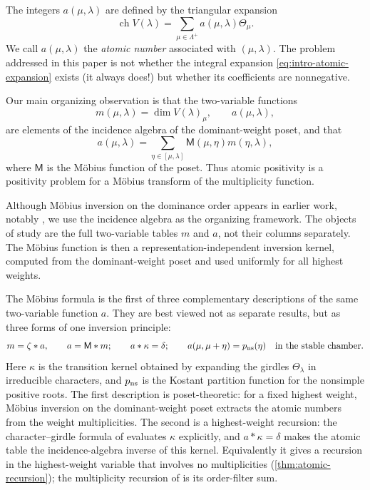 \documentclass[11pt]{article}
\theoremstyle{definition}
\theoremstyle{remark}
\newcommand{\Pesos}{\Lambda}
\newcommand{\chr}{\operatorname{ch}}
\newcommand{\Mu}{\mathsf{M}}
\begin{document}
The integers $a(\mu,\lambda)$ are defined by the triangular expansion
\begin{equation}\label{eq:intro-atomic-expansion}
    \chr V(\lambda)
      =\sum_{\mu\in\Pesos^+} a(\mu,\lambda)\Theta_\mu.
\end{equation}
We call $a(\mu,\lambda)$ the \emph{atomic number} associated with
$(\mu,\lambda)$.  The problem addressed in this paper is not whether the
integral expansion \eqref{eq:intro-atomic-expansion} exists (it always does!)
but whether its coefficients are nonnegative.

Our main organizing observation is that the two-variable functions
\[
   m(\mu,\lambda)=\dim V(\lambda)_\mu,
   \qquad a(\mu,\lambda),
\]
are elements of the incidence algebra of the dominant-weight poset, and that
\begin{equation}\label{eq:intro-mobius}
    a(\mu,\lambda)
      =\sum_{\eta\in[\mu,\lambda]}
        \Mu(\mu,\eta)m(\eta,\lambda),
\end{equation}
where $\Mu$ is the M\"obius function of the poset.  Thus atomic positivity is a
positivity problem for a M\"obius transform of the multiplicity function.

Although M\"obius inversion on the dominance order appears in earlier work,
notably \cite{MR4178925}, we use the incidence algebra as the organizing
framework.  The objects of study are the full two-variable tables $m$ and $a$,
not their columns separately.  The M\"obius function is then a
representation-independent inversion kernel, computed from the dominant-weight
poset and used uniformly for all highest weights.

The M\"obius formula is the first of three complementary descriptions of the
same two-variable function $a$.  They are best viewed not as separate results,
but as three forms of one inversion principle:
\begin{equation}\label{eq:intro-three-descriptions}
   m=\zeta*a,
   \qquad a=\Mu*m;
   \qquad
   a*\kappa=\delta;
   \qquad
   a(\mu,\mu+\eta)=p_{\rm ns}(\eta)
   \quad\text{in the stable chamber}.
\end{equation}
Here $\kappa$ is the transition kernel obtained by expanding the girdles
$\Theta_\lambda$ in irreducible characters, and $p_{\rm ns}$ is the Kostant
partition function for the nonsimple positive roots.  The first description is
poset-theoretic: for a fixed highest weight, M\"obius inversion on the
dominant-weight poset extracts the atomic numbers from the weight
multiplicities.  The second is a highest-weight recursion: the character--girdle
formula of \cite{Schutzer} evaluates $\kappa$ explicitly, and
$a*\kappa=\delta$ makes the atomic table the incidence-algebra inverse of this
kernel.  Equivalently it gives a recursion in the highest-weight variable that
involves no multiplicities (\cref{thm:atomic-recursion}); the multiplicity
recursion of \cite[Corollary~3.1]{Schutzer} is its order-filter sum.
\end{document}
